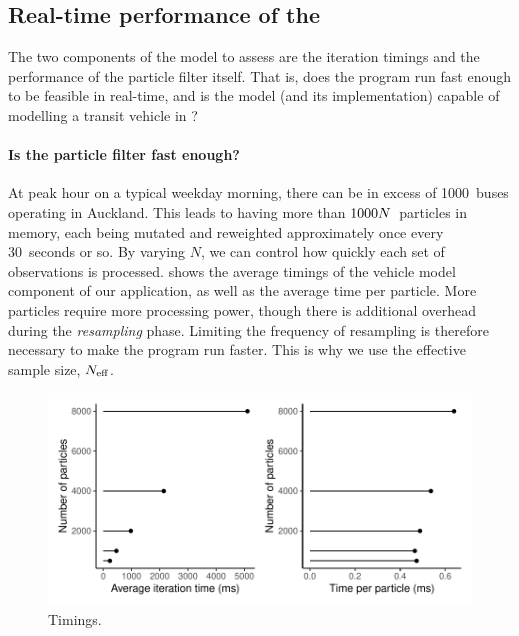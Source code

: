 \subsection{Real-time performance of the \pf{}}
\label{sec:pf_issues}



The two components of the model to assess are the iteration timings and the performance of the particle filter itself. That is, does the program run fast enough to be feasible in real-time, and is the model (and its \pf{} implementation) capable of modelling a transit vehicle in \rt{}?


\paragraph{Is the particle filter fast enough?}
At peak hour on a typical weekday morning, there can be in excess of 1000~buses operating in Auckland. This leads to having more than $1000N$~particles in memory, each being mutated and reweighted approximately once every 30~seconds or so. By varying $N$, we can control how quickly each set of observations is processed.  shows the average timings of the vehicle model component of our application, as well as the average time per particle. More particles require more processing power, though there is additional overhead during the \emph{resampling} phase. Limiting the frequency of resampling is therefore necessary to make the program run faster. This is why we use the effective sample size, $N_\text{eff}$.


\begin{knitrout}
\color{fgcolor}\begin{figure}

{\centering \includegraphics[width=.8\textwidth]{figure/pf_timings-1} 

}

\caption[Timings]{Timings.}\label{fig:pf_timings}
\end{figure}


\end{knitrout}


